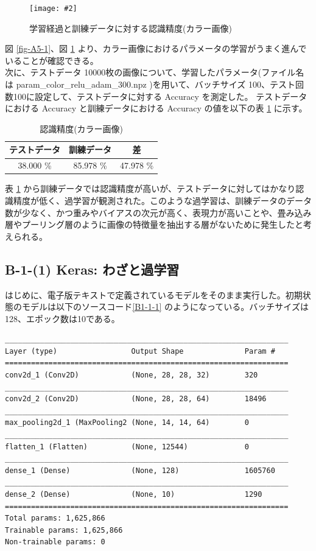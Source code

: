 \documentclass[a4paper,dvipdfmx]{jsarticle}
\newcommand{\image}[3]{
    \begin{figure}[H]
        \begin{center}
        \texttt{[image: \#2]}
        \end{center}
        \caption{#1}
        \label{#3}
    \end{figure}
}
\begin{document}
\image{学習経過と訓練データに対する認識精度(カラー画像)}{report_a5-2.png}{fig-A5-2}

図 \ref{fig-A5-1}、図 \ref{fig-A5-2} より、カラー画像におけるパラメータの学習がうまく進んでいることが確認できる。\\

次に、テストデータ 10000枚の画像について、学習したパラメータ(ファイル名は param\_color\_relu\_adam\_300.npz )を用いて、バッチサイズ 100、テスト回数100に設定して、テストデータに対する Accuracy を測定した。
テストデータにおける Accuracy と訓練データにおける Accuracy の値を以下の表 \ref{tableA5-1} に示す。
\begin{table}[H]
\begin{center}
\caption{認識精度(カラー画像)}
  \begin{tabular}{|c|c|c|} \hline
    テストデータ & 訓練データ & 差 \\ \hline \hline
    38.000 \% & 85.978 \% & 47.978 \%\\ \hline
  \end{tabular}
	\label{tableA5-1}
\end{center}
\end{table}

表 \ref{tableA5-1} から訓練データでは認識精度が高いが、テストデータに対してはかなり認識精度が低く、過学習が観測された。このような過学習は、訓練データのデータ数が少なく、かつ重みやバイアスの次元が高く、表現力が高いことや、畳み込み層やプーリング層のように画像の特徴量を抽出する層がないために発生したと考えられる。 

\newpage

\subsection*{B-1-(1) Keras: わざと過学習}

はじめに、電子版テキストで定義されているモデルをそのまま実行した。初期状態のモデルは以下のソースコード\ref{B1-1-1} のようになっている。バッチサイズは128、エポック数は10である。

\begin{lstlisting}[caption="モデル(初期状態)",label=B1-1-1]
_________________________________________________________________
Layer (type)                 Output Shape              Param #
=================================================================
conv2d_1 (Conv2D)            (None, 28, 28, 32)        320
_________________________________________________________________
conv2d_2 (Conv2D)            (None, 28, 28, 64)        18496
_________________________________________________________________
max_pooling2d_1 (MaxPooling2 (None, 14, 14, 64)        0
_________________________________________________________________
flatten_1 (Flatten)          (None, 12544)             0
_________________________________________________________________
dense_1 (Dense)              (None, 128)               1605760
_________________________________________________________________
dense_2 (Dense)              (None, 10)                1290
=================================================================
Total params: 1,625,866
Trainable params: 1,625,866
Non-trainable params: 0
\end{lstlisting}
\end{document}
